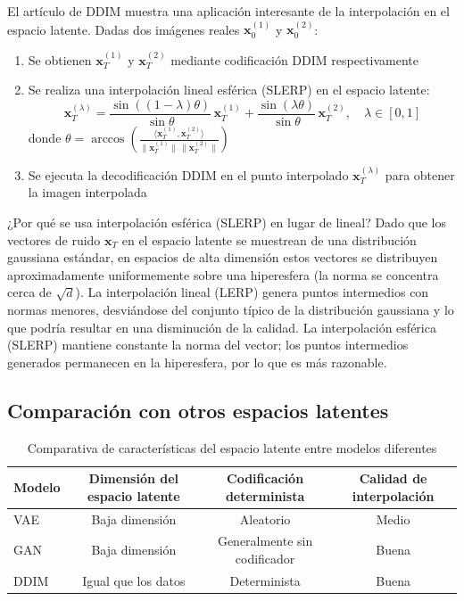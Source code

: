 El artículo de DDIM muestra una aplicación interesante de la interpolación en el espacio latente. Dadas dos imágenes reales $\mathbf{x}_0^{(1)}$ y $\mathbf{x}_0^{(2)}$:

\begin{enumerate}
    \item Se obtienen $\mathbf{x}_T^{(1)}$ y $\mathbf{x}_T^{(2)}$ mediante codificación DDIM respectivamente
    \item Se realiza una interpolación lineal esférica (SLERP) en el espacio latente:
    $$
    \mathbf{x}_T^{(\lambda)} = \frac{\sin((1-\lambda)\theta)}{\sin\theta}\,\mathbf{x}_T^{(1)} + \frac{\sin(\lambda\theta)}{\sin\theta}\,\mathbf{x}_T^{(2)}, \quad \lambda \in [0, 1]
    $$
    donde $\theta = \arccos\left(\frac{\langle\mathbf{x}_T^{(1)}, \mathbf{x}_T^{(2)}\rangle}{\|\mathbf{x}_T^{(1)}\|\,\|\mathbf{x}_T^{(2)}\|}\right)$
    \item Se ejecuta la decodificación DDIM en el punto interpolado $\mathbf{x}_T^{(\lambda)}$ para obtener la imagen interpolada
\end{enumerate}

\begin{knowledgebox}{¿Por qué se usa interpolación esférica (SLERP) en lugar de lineal?}
Dado que los vectores de ruido $\mathbf{x}_T$ en el espacio latente se muestrean de una distribución gaussiana estándar, en espacios de alta dimensión estos vectores se distribuyen aproximadamente uniformemente sobre una hiperesfera (la norma se concentra cerca de $\sqrt{d}$). La interpolación lineal (LERP) genera puntos intermedios con normas menores, desviándose del conjunto típico de la distribución gaussiana y lo que podría resultar en una disminución de la calidad. La interpolación esférica (SLERP) mantiene constante la norma del vector; los puntos intermedios generados permanecen en la hiperesfera, por lo que es más razonable.
\end{knowledgebox}

\subsection{Comparación con otros espacios latentes}

\begin{table}[H]
\centering
\caption{Comparativa de características del espacio latente entre modelos diferentes}
\begin{tabular}{lccc}
\toprule
\textbf{Modelo} & \textbf{Dimensión del espacio latente} & \textbf{Codificación determinista} & \textbf{Calidad de interpolación} \\
\midrule
VAE & Baja dimensión & Aleatorio & Medio \\
GAN & Baja dimensión & Generalmente sin codificador & Buena \\
DDIM & Igual que los datos & Determinista & Buena \\
\bottomrule
\end{tabular}
\end{table}

